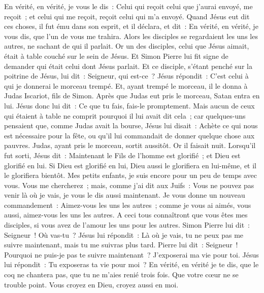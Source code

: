 \begin{multicols}{2}
En vérité, en vérité, je vous le dis~: Celui qui reçoit celui que j'aurai envoyé, me reçoit~; et celui qui me reçoit, reçoit celui qui m'a envoyé.
Quand Jésus eut dit ces choses, il fut ému dans son esprit, et il déclara, et dit~: En vérité, en vérité, je vous dis, que l'un de vous me trahira.
Alors les disciples se regardaient les uns les autres, ne sachant de qui il parlait.
Or un des disciples, celui que Jésus aimait, était à table couché sur le sein de Jésus.
Et Simon Pierre lui fit signe de demander qui était celui dont Jésus parlait.
Et ce disciple, s'étant penché sur la poitrine de Jésus, lui dit~: Seigneur, qui est-ce~?
Jésus répondit~: C'est celui à qui je donnerai le morceau trempé. Et, ayant trempé le morceau, il le donna à Judas Iscariot, fils de Simon.
Après que Judas eut pris le morceau, Satan entra en lui. Jésus donc lui dit~: Ce que tu fais, fais-le promptement.
Mais aucun de ceux qui étaient à table ne comprit pourquoi il lui avait dit cela~;
car quelques-uns pensaient que, comme Judas avait la bourse, Jésus lui disait~: Achète ce qui nous est nécessaire pour la fête, ou qu'il lui commandait de donner quelque chose aux pauvres.
Judas, ayant pris le morceau, sortit aussitôt. Or il faisait nuit.
Lorsqu'il fut sorti, Jésus dit~: Maintenant le Fils de l'homme est glorifié~; et Dieu est glorifié en lui.
Si Dieu est glorifié en lui, Dieu aussi le glorifiera en lui-même, et il le glorifiera bientôt.
Mes petits enfants, je suis encore pour un peu de temps avec vous. Vous me chercherez~; mais, comme j'ai dit aux Juifs~: Vous ne pouvez pas venir là où je vais, je vous le dis aussi maintenant.
Je vous donne un nouveau commandement~: Aimez-vous les uns les autres~; comme je vous ai aimés, vous aussi, aimez-vous les uns les autres.
A ceci tous connaîtront que vous êtes mes disciples, si vous avez de l'amour les uns pour les autres.
Simon Pierre lui dit~: Seigneur~! Où vas-tu~? Jésus lui répondit~: Là où je vais, tu ne peux pas me suivre maintenant, mais tu me suivras plus tard.
Pierre lui dit~: Seigneur~! Pourquoi ne puis-je pas te suivre maintenant~? J'exposerai ma vie pour toi.
Jésus lui répondit~: Tu exposeras ta vie pour moi~? En vérité, en vérité je te dis, que le coq ne chantera pas, que tu ne m'aies renié trois fois.
\VerseOne{}Que votre cœur ne se trouble point. Vous croyez en Dieu, croyez aussi en moi.

\end{multicols}
